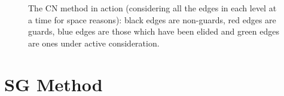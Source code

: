 \documentclass[a4paper]{article}
\newenvironment{stusubfig}[1]
{
	\begin{figure}[#1]
	\begin{center}
}
{
	\end{center}
	\end{figure}
}
\begin{document}
\begin{stusubfig}{p}
	\hspace{4mm}%
	\hspace{4mm}%
\caption[The CN method in action]{The CN method in action (considering all the edges in each level at a time for space reasons): black edges are non-guards, red edges are guards, blue edges are those which have been elided and green edges are ones under active consideration.}
\label{fig:segmentation-waterfall-nicholls-example}
\end{stusubfig}

\section{SG Method}
\label{sec:golodetz}
\end{document}
